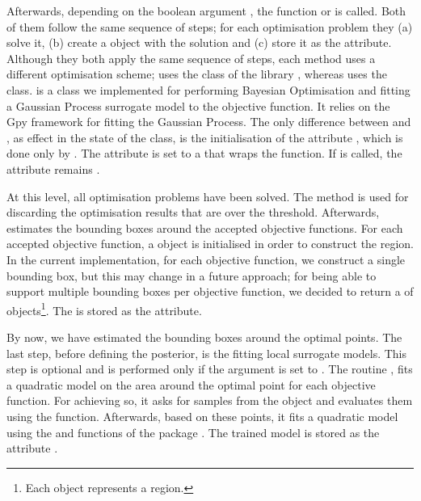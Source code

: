 Afterwards, depending on the boolean argument
, the function \linebreak {}
or  is called. Both of them follow the same
sequence of steps; for each optimisation problem they (a) solve it,
(b) create a  object with the solution
and (c) store it as the 
attribute. Although they both apply the same sequence of steps, each
method uses a different optimisation scheme;
 uses the  class of the
 library \cite{2020SciPy-NMeth}, whereas
 uses the  class.
 is a class we implemented for performing
Bayesian Optimisation and fitting a Gaussian Process surrogate model
to the objective function. It relies on the Gpy framework
\cite{gpy2014} for fitting the Gaussian Process. The only
difference between  and ,
as effect in the state of the  class, is
the initialisation of the attribute 
, which is done only by
. The attribute is set to a  that
wraps the  function. If
 is called, the attribute remains
.

At this level, all optimisation problems have been solved. The method
 is used for discarding the optimisation
results that are over the threshold. Afterwards, 
estimates the bounding boxes around the accepted objective
functions. For each accepted objective function, a
 object is initialised in order to
construct the region. In the current implementation, for each
objective function, we construct a single bounding box, but this may
change in a future approach; for being able to support multiple
bounding boxes per objective function, we decided to return a
 of  objects\footnote{Each
   object represents a region.}. The
 is stored as the 
attribute.

By now, we have estimated the bounding boxes around the optimal
points. The last step, before defining the posterior, is the fitting
local surrogate models. This step is optional and is performed only
if the argument  is set to . The
routine , fits a quadratic model on the area
around the optimal point for each objective function. For achieving
so, it asks for samples from the  object and
evaluates them using the 
function. Afterwards, based on these points, it fits a quadratic model
using the  and
 functions of the
 package \cite{scikit-learn}. The trained
model is stored as the attribute
.


